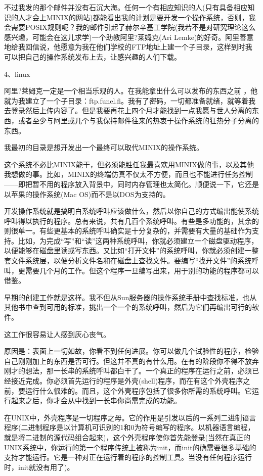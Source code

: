 不过我发的那个邮件并没有石沉大海。任何一个有相应知识的人(只有具备相应知识的人才会上MINIX的网站)都能看出我的计划是要开发一个操作系统，否则，我会需要POSIX规则呢？我的邮件引起了赫尔辛基工学院(我若不是对研究理论这么感兴趣，可能会在这儿求学)一个助教阿里?莱姆克(Ari Lemke)的好奇。阿里善意地给我回信说，他愿意为我在他们学校的FTP地址上建一个子目录，这样到时我可以把自己的操作系统发布上去，让感兴趣的人们下载。

 
4、linux

阿里?莱姆克一定是一个相当乐观的人。在我能拿出什么可以发布的东西之前 ，他就为我建立了一个子目录：ftp.funel.fi。我有了密码，一切都准备就绪，就等着我去登录然后上传内容了。但是我要再花上四个月才能找到一点我愿与世人分离的东西，或者至少与阿里或几个与我保持邮件往来的热衷于操作系统的狂热分子分离的东西。

我最初的目录是想开发出一个最终可以取代MINIX的操作系统。

这个系统不必比MINIX能干，但必须能胜任我最喜欢用MINIX做的事，以及其他我想做的事。比如，MINIX的终端仿真不仅太不方便，而且也不能进行任务控制——即把暂不用的程序放入背景中，同时内存管理也太简化。顺便说一下，它还是以苹果的操作系统(Mac OS)而不是以DOS为支持的。

开发操作系统就是搞明白系统呼叫应该做什么，然后以你自己的方式编出能使系统呼叫得以执行的程序。总有来说，共有几百个系统呼叫。有些是多功能的，其余的则很单一。有些更基本的系统呼叫确实是十分复杂的，并需要有大量的基础作为支持。比如，为完成“写”和“读”这两种系统呼叫，你就必须建立一个磁盘驱动程序，以便能够在磁盘里读或写东西。又比如“打开文件”的系统呼叫，你就必须创建一整套文件系统层，以便分析文件名和在磁盘上查找文件。要编写“找开文件”的系统呼叫，更需要几个月的工作。但这个程序一旦编写出来，用于别的功能的程序都可以借鉴。

早期的创建工作就是这样。我不但从Sun服务器的操作系统手册中查找标准，也从其他书中查到可用的标准，挑出一个一个的系统呼叫，然后为它们再编出可行的软件。

这工作很容易让人感到灰心丧气。

原因是：表面上一切如故，你看不到任何进展。你可以做几个试验性的程序，检验自己刚刚加上的东西是否可行。但这并不真的有什么用。在有的阶段你不得不放弃刚才的想法，那一长串的系统呼叫都白干了。一个真正的程序在运行之前，必须已经接近完成。你必须首先运行的程序是外壳(shell)程序，而在有这个外壳程序之前，要运行什么很难的。而且，这个外壳程序包括了很多你所需的系统呼叫。它运行起来之后，你才会从中找到一长串你尚需完成的功能。

在UNIX中，外壳程序是一切程序之母。它的作用是引发以后的一系列二进制语言程序(二进制程序是以计算机可识别的1和0为符号编写的程序。以机器语言编程，就是将二进制的源代码组合起来)，这个外壳程序使你首先能登录(当然在真正的UNIX系统中，你运行的第一个程序传统上被称为init，而init的确需要很多基础的支持才能运行。它是一种对正在运行着的程序的控制工具。当没有任何程序运行时，init就没有用了)。

